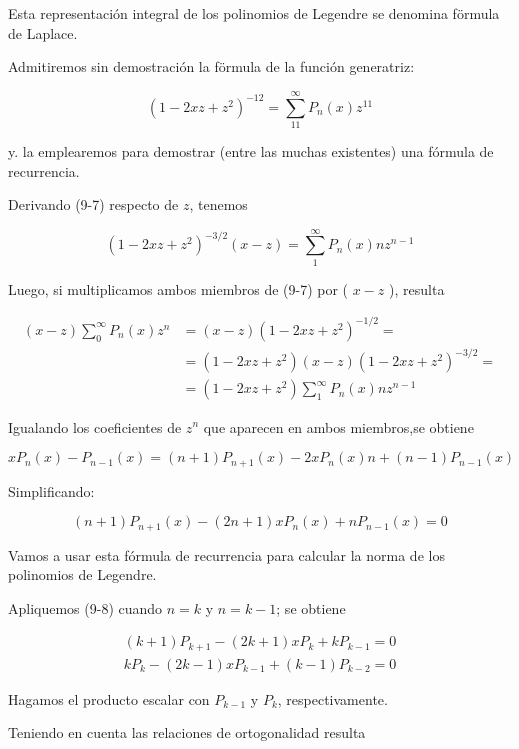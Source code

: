 \documentclass[10pt]{article}
\theoremstyle{plain}
\theoremstyle{definition}
\theoremstyle{remark}
\begin{document}
Esta representación integral de los polinomios de Legendre se denomina förmula de Laplace.

Admitiremos sin demostración la förmula de la función generatriz:


\begin{equation*}
\left(1-2 x z+z^{2}\right)^{-12}=\sum_{11}^{\infty} P_{n}(x) z^{11} \tag{9.7}
\end{equation*}


y. la emplearemos para demostrar (entre las muchas existentes) una fórmula de recurrencia.

Derivando (9-7) respecto de $z$, tenemos

$$
\left(1-2 x z+z^{2}\right)^{-3 / 2}(x-z)=\sum_{1}^{\infty} P_{n}(x) n z^{n-1}
$$

Luego, si multiplicamos ambos miembros de (9-7) por ( $x-z$ ), resulta

$$
\begin{aligned}
(x-z) \sum_{0}^{\infty} P_{n}(x) z^{n} & =(x-z)\left(1-2 x z+z^{2}\right)^{-1 / 2}= \\
& =\left(1-2 x z+z^{2}\right)(x-z)\left(1-2 x z+z^{2}\right)^{-3 / 2}= \\
& =\left(1-2 x z+z^{2}\right) \sum_{1}^{\infty} P_{n}(x) n z^{n-1}
\end{aligned}
$$

Igualando los coeficientes de $z^{n}$ que aparecen en ambos miembros,se obtiene

$$
x P_{n}(x)-P_{n-1}(x)=(n+1) P_{n+1}(x)-2 x P_{n}(x) n+(n-1) P_{n-1}(x)
$$

Simplificando:


\begin{equation*}
(n+1) P_{n+1}(x)-(2 n+1) x P_{n}(x)+n P_{n-1}(x)=0 \tag{9-8}
\end{equation*}


Vamos a usar esta fórmula de recurrencia para calcular la norma de los polinomios de Legendre.

Apliquemos (9-8) cuando $n=k$ y $n=k-1$; se obtiene

$$
\begin{gathered}
(k+1) P_{k+1}-(2 k+1) x P_{k}+k P_{k-1}=0 \\
k P_{k}-(2 k-1) x P_{k-1}+(k-1) P_{k-2}=0
\end{gathered}
$$

Hagamos el producto escalar con $P_{k-1}$ y $P_{k}$, respectivamente.

Teniendo en cuenta las relaciones de ortogonalidad resulta
\end{document}
